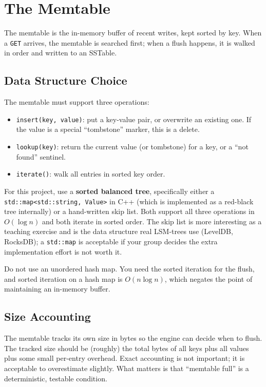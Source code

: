 \documentclass[11pt,a4paper]{article}
\begin{document}
\section{The Memtable}

The memtable is the in-memory buffer of recent writes, kept sorted by key. When a \texttt{GET} arrives, the memtable is searched first; when a flush happens, it is walked in order and written to an SSTable.

\subsection{Data Structure Choice}
The memtable must support three operations:

\begin{itemize}
\item \texttt{insert(key, value)}: put a key-value pair, or overwrite an existing one. If the value is a special ``tombstone'' marker, this is a delete.
\item \texttt{lookup(key)}: return the current value (or tombstone) for a key, or a ``not found'' sentinel.
\item \texttt{iterate()}: walk all entries in sorted key order.
\end{itemize}

For this project, use a \textbf{sorted balanced tree}, specifically either a \texttt{std::map<std::string, Value>} in C++ (which is implemented as a red-black tree internally) or a hand-written skip list. Both support all three operations in $O(\log n)$ and both iterate in sorted order. The skip list is more interesting as a teaching exercise and is the data structure real LSM-trees use (LevelDB, RocksDB); a \texttt{std::map} is acceptable if your group decides the extra implementation effort is not worth it.

Do not use an unordered hash map. You need the sorted iteration for the flush, and sorted iteration on a hash map is $O(n \log n)$, which negates the point of maintaining an in-memory buffer.

\subsection{Size Accounting}
The memtable tracks its own size in bytes so the engine can decide when to flush. The tracked size should be (roughly) the total bytes of all keys plus all values plus some small per-entry overhead. Exact accounting is not important; it is acceptable to overestimate slightly. What matters is that ``memtable full'' is a deterministic, testable condition.
\end{document}
